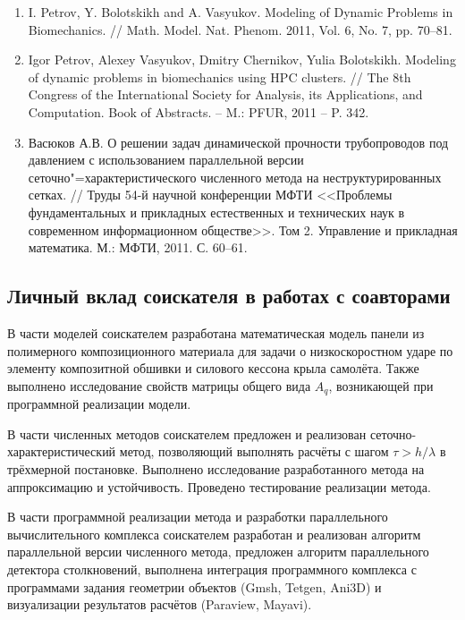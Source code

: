 \begin{enumerate}
\item I. Petrov, Y. Bolotskikh and A. Vasyukov. Modeling of Dynamic Problems in Biomechanics. // Math. Model. Nat. Phenom. 2011, Vol. 6, No. 7, pp. 70--81.
\item Igor Petrov, Alexey Vasyukov, Dmitry Chernikov, Yulia Bolotskikh. Modeling of dynamic problems in biomechanics using HPC clusters. // The 8th Congress of the International Society for Analysis, its Applications, and Computation. Book of Abstracts. -- M.: PFUR, 2011 -- P. 342.
\item Васюков А.В. О решении задач динамической прочности трубопроводов под давлением с использованием параллельной версии сеточно"=характеристического численного метода на неструктурированных сетках. // Труды 54-й научной конференции МФТИ <<Проблемы фундаментальных и прикладных естественных и технических наук в современном информационном обществе>>. Том 2. Управление и прикладная математика. М.: МФТИ, 2011. С. 60--61.
\end{enumerate}

\subsection*{Личный вклад соискателя в работах с соавторами}

В части моделей соискателем разработана математическая модель панели из полимерного композиционного материала для задачи о низкоскоростном ударе по элементу композитной обшивки и силового кессона крыла самолёта. Также выполнено исследование свойств матрицы общего вида $A_q$, возникающей при программной реализации модели.

В части численных методов соискателем предложен и реализован сеточно-характеристический метод, позволяющий выполнять расчёты с шагом $\tau > h / \lambda$ в трёхмерной постановке. Выполнено исследование разработанного метода на аппроксимацию и устойчивость. Проведено тестирование реализации метода.

В части программной реализации метода и разработки параллельного вычислительного комплекса соискателем разработан и реализован алгоритм параллельной версии численного метода, предложен алгоритм параллельного детектора столкновений, выполнена интеграция программного комплекса с программами задания геометрии объектов (Gmsh, Tetgen, Ani3D) и визуализации результатов расчётов (Paraview, Mayavi).

